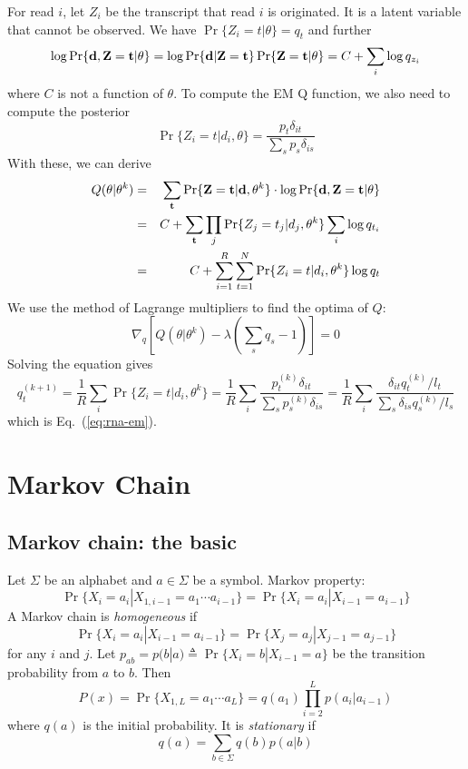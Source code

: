 \documentclass[10pt]{article}
\begin{document}
For read $i$, let $Z_i$ be the transcript that read $i$ is originated.
It is a latent variable that cannot be observed.
We have $\Pr\{Z_i=t|\theta\}=q_t$ and further
\[
\log\Pr\{{\bf d},{\bf Z}={\bf t}|\theta\}=\log\Pr\{{\bf d}|{\bf Z}={\bf t}\}\Pr\{{\bf Z}={\bf t}|\theta\}=C+\sum_i\log q_{z_i}
\]
where $C$ is not a function of $\theta$.
To compute the EM Q function, we also need to compute the posterior
$$
\Pr\{Z_i=t|d_i,\theta\}=\frac{p_t\delta_{it}}{\sum_{s}p_s\delta_{is}}
$$
With these, we can derive
\begin{eqnarray*}
Q(\theta|\theta^k)&=&\sum_{{\bf t}}\Pr\{{\bf Z}={\bf t}|{\bf d},\theta^k\}\cdot\log\Pr\{{\bf d},{\bf Z}={\bf t}|\theta\}\\
&=&C+\sum_{{\bf t}}\prod_j\Pr\{Z_j=t_j|d_j,\theta^k\}\sum_i\log q_{t_i}\\
&=&C+\sum_{i=1}^R\sum_{t=1}^N\Pr\{Z_i=t|d_i,\theta^k\}\log q_t\\
\end{eqnarray*}
We use the method of Lagrange multipliers to find the optima of $Q$:
$$
\nabla_q\left[Q(\theta|\theta^k)-\lambda\left(\sum_sq_s-1\right)\right]=0
$$
Solving the equation gives
$$
q^{(k+1)}_t=\frac{1}{R}\sum_i\Pr\{Z_i=t|d_i,\theta^k\}=\frac{1}{R}\sum_i\frac{p^{(k)}_t\delta_{it}}{\sum_s{p^{(k)}_s\delta_{is}}}
=\frac{1}{R}\sum_i\frac{\delta_{it}q^{(k)}_t/l_t}{\sum_s{\delta_{is}q^{(k)}_s/l_s}}
$$
which is Eq.~(\ref{eq:rna-em}).

\newpage

\section{Markov Chain}

\subsection{Markov chain: the basic}
Let $\Sigma$ be an alphabet and $a\in\Sigma$ be a symbol. Markov property:
$$
\Pr\{X_i=a_i|X_{1,i-1}=a_1\cdots a_{i-1}\}=\Pr\{X_i=a_i|X_{i-1}=a_{i-1}\}
$$
A Markov chain is \emph{homogeneous} if
$$
\Pr\{X_i=a_i|X_{i-1}=a_{i-1}\}=\Pr\{X_j=a_j|X_{j-1}=a_{j-1}\}
$$
for any $i$ and $j$. Let $p_{ab}=p(b|a)\triangleq\Pr\{X_i=b|X_{i-1}=a\}$ be the
transition probability from $a$ to $b$. Then
$$
P(x)=\Pr\{X_{1,L}=a_1\cdots a_L\}=q(a_1)\prod_{i=2}^Lp(a_i|a_{i-1})
$$
where $q(a)$ is the initial probability. It is \emph{stationary} if
$$
q(a)=\sum_{b\in\Sigma} q(b)p(a|b)
$$
\end{document}
